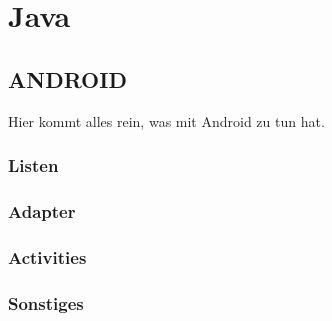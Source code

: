 \chapter{Java}
\section{ANDROID}
Hier kommt alles rein, was mit Android zu tun hat.

\subsection{Listen}
\subsection{Adapter}
\subsection{Activities}
\subsection{Sonstiges}
